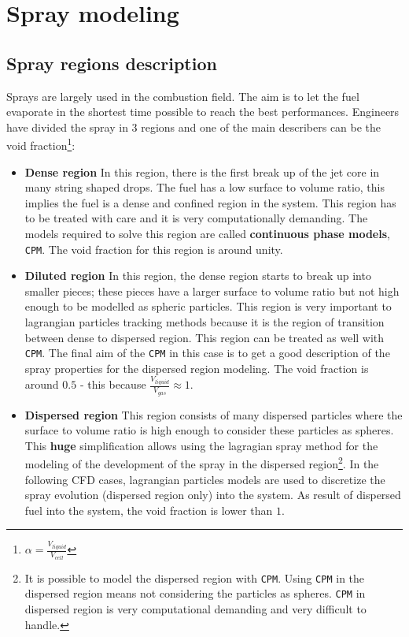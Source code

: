 \section{Spray modeling} \label{app:app3_1}
    \subsection{Spray regions description}
    Sprays are largely used in the combustion field. The aim is to let the fuel evaporate in the shortest time possible to reach the best performances.
    Engineers have divided the spray in 3 regions and one of the main describers can be the void fraction\footnote{$\alpha = \frac{V_{liquid}}{V_{cell}}$}: 
    \begin{itemize}
        \item \textbf{Dense region} In this region, there is the first break up of the jet core in many string shaped drops. The fuel has a low surface to volume ratio, this implies the fuel is a dense and confined region in the system. This region has to be treated with care and it is very computationally demanding. The models required to solve this region are called \textbf{continuous phase models}, \verb|CPM|. The void fraction for this region is around unity. 
      
        \item \textbf{Diluted region} In this region, the dense region starts to break up into smaller pieces; these pieces have a larger surface to volume ratio but not high enough to be modelled as spheric particles. This region is very important to lagrangian particles tracking methods because it is the region of transition between dense to dispersed region. This region can be treated as well with \verb|CPM|. The final aim of the \verb|CPM| in this case is to get a good description of the spray properties for the dispersed region modeling. The void fraction is around $0.5$ - this because $\frac{V_{liquid}}{V_{gas}} \approx 1$.
       
        \item \textbf{Dispersed region} This region consists of many dispersed particles where the surface to volume ratio is high enough to consider these particles as spheres. This \textbf{huge} simplification allows using the lagragian spray method for the modeling of the development of the spray in the dispersed region\cprotect\footnote{It is possible to model the dispersed region with \verb|CPM|. Using \verb|CPM| in the dispersed region means not considering the particles as spheres. \verb|CPM| in dispersed region is very computational demanding and very difficult to handle.}. In the following CFD cases, lagrangian particles models are used to discretize the spray evolution (dispersed region only) into the system. As result of dispersed fuel into the system, the void fraction is lower than $1$.
    \end{itemize}

